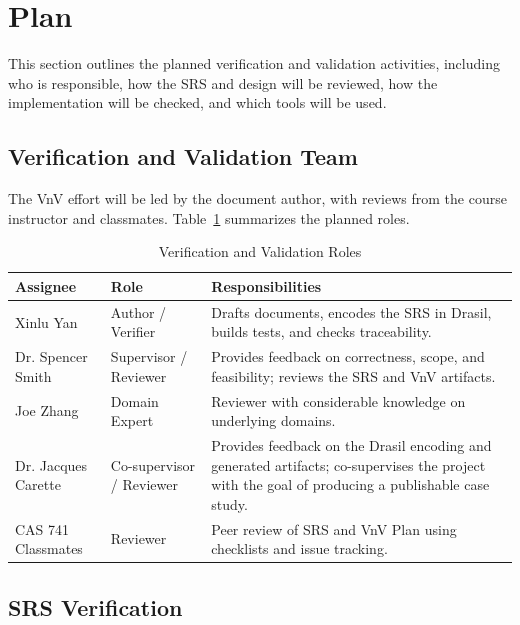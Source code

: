 \documentclass[12pt, titlepage]{article}
\begin{document}
\newpage

\section{Plan}

This section outlines the planned verification and validation activities,
including who is responsible, how the SRS and design will be reviewed, how the
implementation will be checked, and which tools will be used.

\subsection{Verification and Validation Team}

The VnV effort will be led by the document author, with reviews from the course
instructor and classmates. Table~\ref{tab:vnv-roles} summarizes the planned
roles.

\begin{table}[h!]
\centering
\begin{tabularx}{\textwidth}{p{3.5cm}p{3.5cm}X}
\toprule
\textbf{Assignee} & \textbf{Role} & \textbf{Responsibilities} \\
\midrule
Xinlu Yan & Author / Verifier & Drafts documents, encodes the SRS in Drasil,
builds tests, and checks traceability. \\
Dr. Spencer Smith & Supervisor / Reviewer & Provides feedback on correctness,
scope, and feasibility; reviews the SRS and VnV artifacts. \\
Joe Zhang & Domain Expert & Reviewer with considerable knowledge on underlying
domains. \\
Dr. Jacques Carette & Co-supervisor / Reviewer & Provides feedback on the Drasil
encoding and generated artifacts; co-supervises the project with the goal of
producing a publishable case study. \\
CAS 741 Classmates & Reviewer & Peer review of SRS and VnV Plan using checklists
and issue tracking. \\
\bottomrule
\end{tabularx}
\caption{Verification and Validation Roles}
\label{tab:vnv-roles}
\end{table}

\subsection{SRS Verification}\label{SRSVerification}
\end{document}
